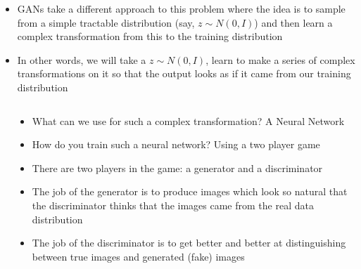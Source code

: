 \begin{frame}
		\begin{overlayarea}{\textwidth}{\textheight}
		\vspace*{5mm}
		\begin{center}
					
		\end{center}

			\begin{itemize}[<+->]
			\item GANs take a different approach to this problem where the idea is to sample from a simple tractable distribution (say, $z \sim N(0, I)$) and then learn a complex transformation from this to the training distribution
			\item In other words, we will take a $z \sim N(0,I)$, learn to make a series of complex transformations on it so that the output looks as if it came from our training distribution 
			
			\end{itemize}		
		\end{overlayarea}			
\end{frame}
\begin{frame}
	\begin{columns}
		\begin{overlayarea}{\textwidth}{\textheight}
			\vspace*{10mm}
			\begin{center}
						
			\end{center}		
		\end{overlayarea}

		\begin{overlayarea}{\textwidth}{\textheight}
			\begin{itemize}[<+->]
				\item What can we use for such a complex transformation? \onslide<2-> \alert<2> {A Neural Network}
				\item<3-> How do you train such a neural network? \onslide<4-> \alert<4>{Using a two player game} 
				\item<5-> There are two players in the game: \onslide<6-> \alert<6>{a generator} \onslide<7-> and \alert<7>{a discriminator}
				\item<8-> The job of the generator is to produce images which look so natural that the discriminator thinks that the images came from the real data distribution
				\item<9-> The job of the discriminator is to get better and better at distinguishing between true images and generated (fake) images
			\end{itemize}
		\end{overlayarea}
	\end{columns}
\end{frame}


